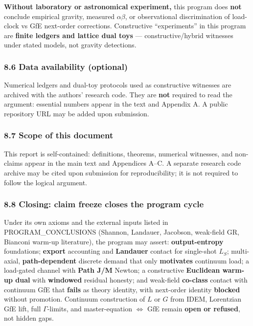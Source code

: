 \documentclass[
  11pt,
]{article}
\begin{document}
\textbf{Without laboratory or astronomical experiment,} this program
does \textbf{not} conclude empirical gravity, measured \(\alpha\beta\),
or observational discrimination of load-clock vs GfE next-order
corrections. Constructive ``experiments'' in this program are
\textbf{finite ledgers and lattice dual toys} --- constructive/hybrid
witnesses under stated models, not gravity detections.

\subsubsection{8.6 Data availability
(optional)}\label{data-availability-optional}

Numerical ledgers and dual-toy protocols used as constructive witnesses
are archived with the authors' research code. They are \textbf{not}
required to read the argument: essential numbers appear in the text and
Appendix A. A public repository URL may be added upon submission.

\subsubsection{8.7 Scope of this document}\label{scope-of-this-document}

This report is self-contained: definitions, theorems, numerical
witnesses, and non-claims appear in the main text and Appendices A--C. A
separate research code archive may be cited upon submission for
reproducibility; it is not required to follow the logical argument.

\subsubsection{8.8 Closing: claim freeze closes the program
cycle}\label{closing-claim-freeze-closes-the-program-cycle}

Under its own axioms and the external inputs listed in
PROGRAM\_CONCLUSIONS (Shannon, Landauer, Jacobson, weak-field GR,
Bianconi warm-up literature), the program may assert:
\textbf{output-entropy} foundations; \textbf{export} accounting and
\textbf{Landauer} contact for single-shot \(L_S\); multi-axial,
\textbf{path-dependent} discrete demand that only \textbf{motivates}
continuum load; a load-gated channel with \textbf{Path J/M} Newton; a
constructive \textbf{Euclidean warm-up dual} with \textbf{windowed}
residual honesty; and weak-field \textbf{co-class} contact with
continuum GfE that \textbf{fails} as theory identity, with next-order
identity \textbf{blocked} without promotion. Continuum construction of
\(L\) or \(G\) from IDEM, Lorentzian GfE lift, full \(\Gamma\)-limits,
and master-equation \(\Leftrightarrow\) GfE remain \textbf{open or
refused}, not hidden gaps.
\end{document}
